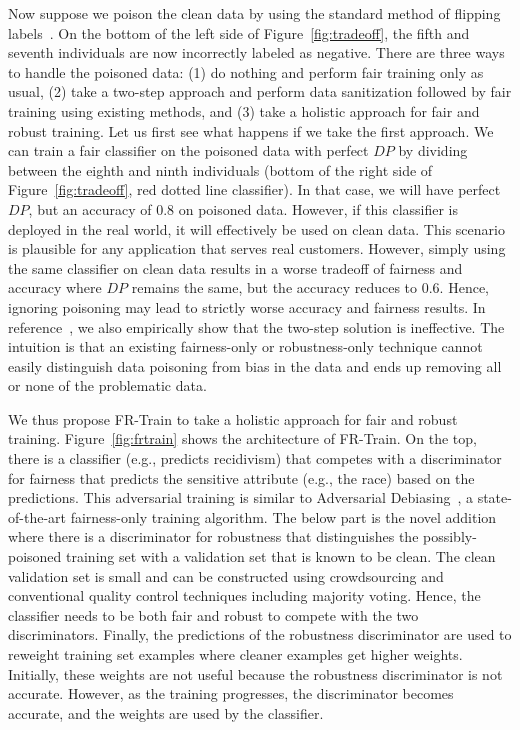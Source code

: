 \documentclass[11pt]{article}
\newcommand{\frtrain}{FR-Train}
\begin{document}
Now suppose we poison the clean data by using the standard method of flipping labels~\cite{DBLP:conf/pkdd/PaudiceML18}. On the bottom of the left side of Figure~\ref{fig:tradeoff}, the fifth and seventh individuals are now incorrectly labeled as negative. There are three ways to handle the poisoned data: (1) do nothing and perform fair training only as usual, (2) take a two-step approach and perform data sanitization followed by fair training using existing methods, and (3) take a holistic approach for fair and robust training. Let us first see what happens if we take the first approach. We can train a fair classifier on the poisoned data with perfect $DP$ by dividing between the eighth and ninth individuals (bottom of the right side of Figure~\ref{fig:tradeoff}, red dotted line classifier). In that case, we will have perfect $DP$, but an accuracy of 0.8 on poisoned data. However, if this classifier is deployed in the real world, it will effectively be used on clean data. This scenario is plausible for any application that serves real customers. However, simply using the same classifier on clean data results in a worse tradeoff of fairness and accuracy where $DP$ remains the same, but the accuracy reduces to 0.6. Hence,  ignoring poisoning may lead to strictly worse accuracy and fairness results. In reference~\cite{DBLP:conf/icml/RohLWS20}, we also empirically show that the two-step solution is ineffective. The intuition is that an existing fairness-only or robustness-only technique cannot easily distinguish data poisoning from bias in the data and ends up removing all or none of the problematic data.


We thus propose \frtrain{} to take a holistic approach for fair and robust training. Figure~\ref{fig:frtrain} shows the architecture of \frtrain{}. On the top, there is a classifier (e.g., predicts recidivism) that competes with a discriminator for fairness that predicts the sensitive attribute (e.g., the race) based on the predictions. This adversarial training is similar to Adversarial Debiasing~\cite{DBLP:conf/aies/ZhangLM18}, a state-of-the-art fairness-only training algorithm. The below part is the novel addition where there is a discriminator for robustness that distinguishes the possibly-poisoned training set with a validation set that is known to be clean. The clean validation set is small and can be constructed using crowdsourcing and conventional quality control techniques including majority voting. Hence, the classifier needs to be both fair and robust to compete with the two discriminators. Finally, the predictions of the robustness discriminator are used to reweight training set examples where cleaner examples get higher weights. Initially, these weights are not useful because the robustness discriminator is not accurate. However, as the training progresses, the discriminator becomes accurate, and the weights are used by the classifier.
\end{document}
